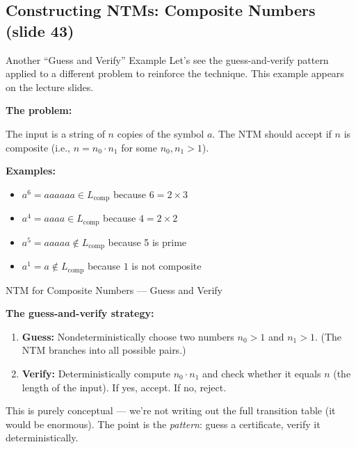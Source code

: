 \subsection{Constructing NTMs: Composite Numbers (slide 43)}
\label{subsec:composite}

\begin{notebox}{Another ``Guess and Verify'' Example}
Let's see the guess-and-verify pattern applied to a different problem to
reinforce the technique. This example appears on the lecture slides.

\textbf{The problem:}

The input is a string of $n$ copies of the symbol $a$. The NTM should accept if
$n$ is composite (i.e., $n = n_0 \cdot n_1$ for some $n_0, n_1 > 1$).

\textbf{Examples:}
\begin{itemize}[nosep]
\item $a^6 = aaaaaa \in L_{\text{comp}}$ because $6 = 2 \times 3$
\item $a^4 = aaaa \in L_{\text{comp}}$ because $4 = 2 \times 2$
\item $a^5 = aaaaa \notin L_{\text{comp}}$ because 5 is prime
\item $a^1 = a \notin L_{\text{comp}}$ because $1$ is not composite
\end{itemize}
\end{notebox}

\begin{definitionbox}{{NTM for Composite Numbers --- Guess and Verify}}

\textbf{The guess-and-verify strategy:}
\begin{enumerate}[nosep]
\item \textbf{Guess:} Nondeterministically choose two numbers $n_0 > 1$ and
  $n_1 > 1$. (The NTM branches into all possible pairs.)
\item \textbf{Verify:} Deterministically compute $n_0 \cdot n_1$ and check
  whether it equals $n$ (the length of the input). If yes, accept. If no,
  reject.
\end{enumerate}

This is purely conceptual --- we're not writing out the full transition table
(it would be enormous). The point is the \emph{pattern}: guess a certificate,
verify it deterministically.
\end{definitionbox}

